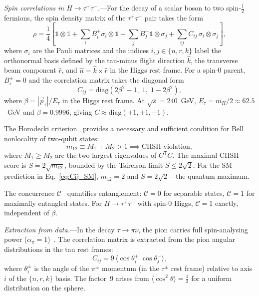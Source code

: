\documentclass[prl,twocolumn,superscriptaddress,floatfix]{revtex4-2}
\newcommand{\tautau}{\tau^+\tau^-}
\newcommand{\Htautau}{H\!\to\!\tautau}
\newcommand{\mtwo}{m_{12}}
\newcommand{\sqrts}{\sqrt{s}}
\begin{document}
\textit{Spin correlations in $\Htautau$.}---For the decay of a scalar
boson to two spin-$\tfrac12$ fermions, the spin density matrix of the
$\tautau$ pair takes the form~\cite{Bernreuther2015,Fabbrichesi2022}
\begin{equation}
  \rho = \frac{1}{4}\!\left[\mathbb{1}\otimes\mathbb{1}
    + \sum_{i} B_i^+ \sigma_i\otimes\mathbb{1}
    + \sum_{j} B_j^- \mathbb{1}\otimes\sigma_j
    + \sum_{ij} C_{ij}\,\sigma_i\otimes\sigma_j \right]\!,
  \label{eq:rho}
\end{equation}
where $\sigma_i$ are the Pauli matrices and the indices $i,j\in\{n,r,k\}$
label the orthonormal basis defined by the tau-minus flight direction
$\hat{k}$, the transverse beam component $\hat{r}$, and
$\hat{n}=\hat{k}\times\hat{r}$ in the Higgs rest
frame.  For a spin-0 parent, $B_i^\pm=0$ and the correlation matrix
takes the diagonal form~\cite{Fabbrichesi2022,Barr2024}
\begin{equation}
  C_{ij} = \mathrm{diag}\!\left(2\beta^2-1,\; 1,\; 1-2\beta^2\right),
  \label{eq:Cij_SM}
\end{equation}
where $\beta=|\vec{p}_\tau|/E_\tau$ in the Higgs rest frame. At
$\sqrts=240$~GeV, $E_\tau = m_H/2 \approx 62.5$~GeV and
$\beta=0.9996$, giving $C\approx \mathrm{diag}(+1,+1,-1)$.

The Horodecki criterion~\cite{Horodecki1995} provides a necessary and
sufficient condition for Bell nonlocality of two-qubit states:
\begin{equation}
  \mtwo \equiv M_1 + M_2 > 1 \implies
  \text{CHSH violation},
  \label{eq:m12}
\end{equation}
where $M_1 \geq M_2$ are the two largest eigenvalues of $C^\mathsf{T}\!C$.
The maximal CHSH score is $S = 2\sqrt{\mtwo}$, bounded by the
Tsirelson limit $S\leq 2\sqrt{2}$.  For the SM prediction in
Eq.~\eqref{eq:Cij_SM}, $\mtwo=2$ and $S=2\sqrt{2}$---the quantum
maximum.

The concurrence $\mathcal{C}$~\cite{Wootters1998} quantifies
entanglement: $\mathcal{C}=0$ for separable states, $\mathcal{C}=1$
for maximally entangled states.  For $\Htautau$ with spin-0 Higgs,
$\mathcal{C}=1$ exactly, independent of $\beta$.

\textit{Extraction from data.}---In the decay $\tau\to\pi\nu$, the
pion carries full spin-analysing power ($\alpha_\pi=1$)~\cite{Tsai1971}.
The correlation matrix is extracted from the pion angular distributions
in the tau rest frames:
\begin{equation}
  C_{ij} = 9\,\bigl\langle
    \cos\theta_i^+\;\cos\theta_j^-
  \bigr\rangle,
  \label{eq:Cij_extract}
\end{equation}
where $\theta_i^\pm$ is the angle of the $\pi^\pm$ momentum (in the
$\tau^\pm$ rest frame) relative to axis $i$ of the $\{n,r,k\}$ basis.
The factor~9 arises from $\langle\cos^2\theta\rangle=\frac13$ for a
uniform distribution on the sphere.
\end{document}

